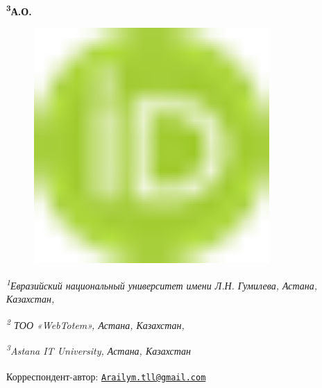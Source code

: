 {\bfseries \textsuperscript{3}А.О.
\begin{figure}[H]
	\centering
	\includegraphics[width=0.8\textwidth]{media/ict/image1}
	\caption*{}
\end{figure}


\emph{\textsuperscript{1}Евразийский национальный университет имени Л.Н.
Гумилева, Астана, Казахстан,}

\emph{\textsuperscript{2} ТОО «WebTotem», Астана, Казахстан,}

\emph{\textsuperscript{3}Astana IT University, Астана, Казахстан}

{\bfseries \textsuperscript{\envelope }}Корреспондент-автор:
\href{mailto:Arailym.tll@gmail.com}{\nolinkurl{Arailym.tll@gmail.com}}

}

